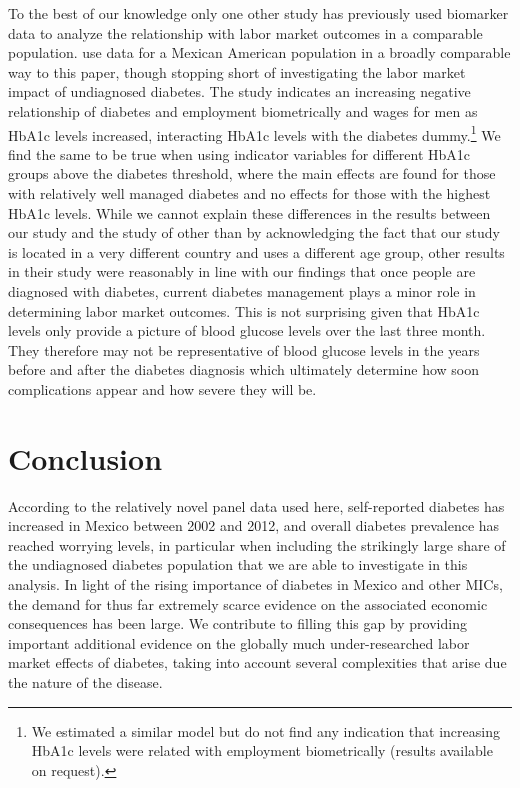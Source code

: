 \documentclass[12pt,english,british]{article}
\begin{document}
To the best of our knowledge only one other study has previously used biomarker data to analyze the relationship with labor market outcomes in a comparable population. \citet{BrownIII2011} use data for a Mexican American
population in a broadly comparable way to this paper, though stopping short of investigating
the labor market impact of undiagnosed diabetes. The study indicates
an increasing negative relationship of diabetes and employment
biometrically and wages for men as \ac{HbA1c} levels increased, interacting \ac{HbA1c} levels
with the diabetes dummy.\footnote{We estimated a similar model but
do not find any indication that increasing \ac{HbA1c} levels were
related with employment biometrically (results available on request).} We
find the same to be true when using indicator variables for different
\ac{HbA1c} groups above the diabetes threshold, where the main effects
are found for those with relatively well managed diabetes and no
effects for those with the highest \ac{HbA1c} levels. While we cannot explain these differences in the results between our study and the study of \citet{BrownIII2011} other than by acknowledging the fact that our study is located in a very different country and uses a different age group, other results in their study were reasonably in line with our findings that once people are diagnosed with diabetes, current diabetes management plays a minor role in determining labor market outcomes. This is not surprising given that \ac{HbA1c} levels only provide a picture of blood glucose levels over the last three month. They therefore may not be representative of blood glucose levels in the years before and after the diabetes diagnosis which ultimately determine how soon complications appear and how severe they will be.

\section{\label{sec:Conclusion}Conclusion}

According to the relatively novel panel data used here, self-reported diabetes has increased in Mexico between 2002 and 2012, and overall
diabetes prevalence has reached worrying
levels, in particular when including the strikingly large share of the undiagnosed diabetes population that we are able to investigate in this analysis. In light of the rising importance of diabetes in Mexico and other \ac{MICs}, the demand for  thus far extremely scarce evidence on the associated economic consequences has been large. We contribute to filling this gap by providing important additional evidence on the globally much under-researched labor market effects of diabetes, taking into account several complexities that arise due the nature of the disease.
\end{document}
